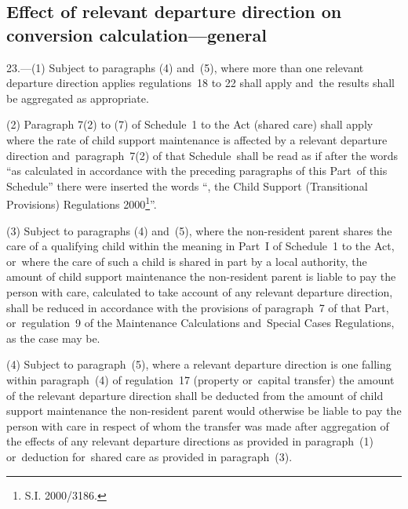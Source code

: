 \documentclass[12pt,a4paper]{article}
\begin{document}

\subsection[23. Effect of relevant departure direction on conversion calculation—general]{Effect of relevant departure direction on conversion calculation—general}

23.---(1) Subject to paragraphs (4) and~(5), where more than one relevant departure direction applies regulations~18 to 22 shall apply and~the results shall be aggregated as appropriate.

(2) Paragraph 7(2) to (7) of Schedule~1 to the Act (shared care) shall apply where the rate of child support maintenance is affected by a relevant departure direction
and~paragraph~7(2) of that Schedule~shall be read as if after the words “as calculated in accordance with the preceding paragraphs of this Part~of this Schedule” there were inserted the words “, the Child Support (Transitional Provisions) Regulations 2000\footnote{\frenchspacing S.I. 2000/3186.}”.

(3) Subject to paragraphs (4) and~(5), where the non-resident parent shares the care of a qualifying child within the meaning in Part~I of Schedule~1 to the Act, or~where the care of such a child is shared in part by a local authority, the amount of child support maintenance the non-resident parent is liable to pay the person with care, calculated to take account of any relevant departure direction, shall be reduced in accordance with the provisions of paragraph~7 of that Part, or~regulation~9 of the Maintenance Calculations and~Special Cases Regulations, as the case may be.

(4) Subject to paragraph~(5), where a relevant departure direction is one falling within paragraph~(4) of regulation~17 (property or~capital transfer) the amount of the relevant departure direction shall be deducted from the amount of child support maintenance the non-resident parent would otherwise be liable to pay the person with care in respect of whom the transfer was made after aggregation of the effects of any relevant departure directions as provided in paragraph~(1) or~deduction for~shared care as provided in paragraph~(3).
\end{document}
